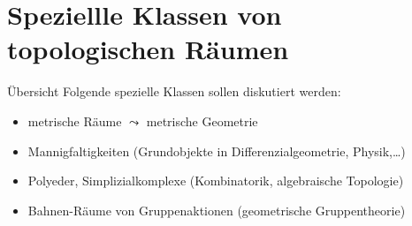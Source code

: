 \chapter{Speziellle Klassen von topologischen Räumen}

\begin{bla}{Übersicht}
  Folgende spezielle Klassen sollen diskutiert werden:
  \begin{itemize}
    \item metrische Räume $ \leadsto $ metrische Geometrie
    \item Mannigfaltigkeiten (Grundobjekte in Differenzialgeometrie, Physik,\dots)
    \item Polyeder, Simplizialkomplexe (Kombinatorik, algebraische Topologie)
    \item Bahnen-Räume von Gruppenaktionen (geometrische Gruppentheorie)
  \end{itemize}
\end{bla}